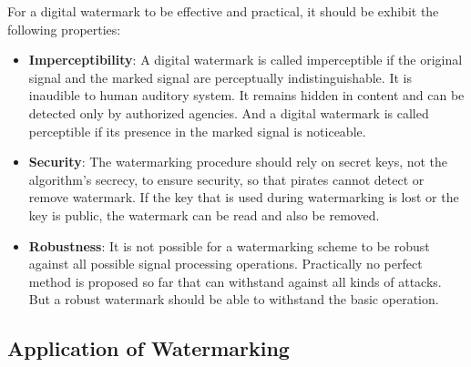 \documentclass[12pt,a4paper]{report}
\begin{document}
For a digital watermark to be effective and practical, it should be exhibit the following properties:

\begin{itemize}

\item \textbf{Imperceptibility}: A digital watermark is called imperceptible if the original signal and the marked signal are perceptually indistinguishable. It is inaudible to human auditory system. It remains hidden in content and can be detected only by authorized agencies. And a digital watermark is called perceptible if its presence in the marked signal is noticeable.

\item \textbf{Security}: The watermarking procedure should rely on secret keys, not the algorithm's secrecy, to ensure security, so that pirates cannot detect or remove watermark. If the key that is used during watermarking is lost or the key is public, the watermark can be read and also be removed.

\item \textbf{Robustness}: It is not possible for a watermarking scheme to be robust against all possible signal processing operations. Practically no perfect method is proposed so far that can withstand against all kinds of attacks. But a robust watermark should be able to withstand the basic operation.

\end{itemize}

\subsection{Application of Watermarking}
\end{document}
